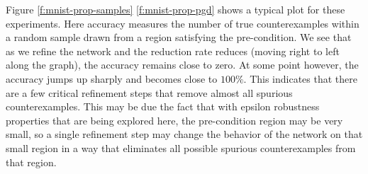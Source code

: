 Figure \ref{f:mnist-prop-samples} \ref{f:mnist-prop-pgd} shows a typical plot
for these experiments.  Here accuracy measures the number of true
counterexamples within a random sample
drawn from a region satisfying the pre-condition.   We see that as we refine the
network and the reduction rate reduces (moving right to left along the graph),
the accuracy remains close to zero. At some point however, the accuracy jumps up
sharply and becomes close to $100\%$. This indicates that there are a few
critical refinement steps that remove almost all spurious counterexamples. This
may be due the fact that with epsilon robustness properties that are being
explored here, the pre-condition region may be very small, so a single
refinement step may change the behavior of the network on that small region in a
way that eliminates all possible spurious counterexamples from that region.
 
  


